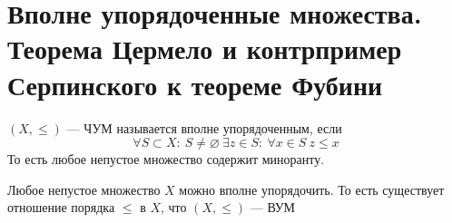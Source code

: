 \newpage
\section{Вполне упорядоченные множества. Теорема Цермело и контрпример Серпинского к теореме Фубини}

\begin{definition}
	$(X, \leq)$ --- ЧУМ называется вполне упорядоченным, если 
	$$
	\forall S \subset X: \ S \neq \varnothing \ \exists z \in S: \ \forall x \in S \ z \leq x
	$$
	То есть любое непустое множество содержит миноранту.
\end{definition}
\begin{theorem}[Цермело]
	Любое непустое множество $X$ можно вполне упорядочить. То есть существует отношение порядка $\leq$ в $X$, что $(X, \leq)$ --- ВУМ
\end{theorem}
